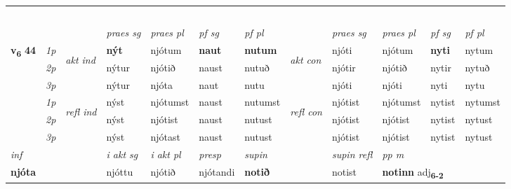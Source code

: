 \begin{longtable}[l]{X>{\footnotesize\itshape}llXXXXlXXXX}
\midrule
  & \\*
   & \\*
     & \\*
   & \\*
  & \\
   \midrule
 & &   & \textit{praes sg}  & \textit{praes pl}    & \textit{ pf sg} & \textit{pf pl} & & \textit{praes sg}  & \textit{praes pl}    & \textit{pf sg} & \textit{pf pl }  \\ \cmidrule{4-7} \cmidrule{9-12}
 \multirow{2}{*}{{{\textbf{v{\textsubscript{6}}} \Large{\textbf{44}}}}}  & 1p & \multirow{3}{*}{\begin{turn}{90}\textit{akt ind}\end{turn}} & \textbf{nýt} & njótum & \textbf{naut} & \textbf{nutum} & \multirow{3}{*}{\begin{turn}{90}\textit{akt con}\end{turn}} &njóti & njótum & \textbf{nyti} & nytum\\*
 & 2p &  &  nýtur  & njótið & naust & nutuð & & njótir & njótið & nytir & nytuð \\*
 & 3p &  & nýtur & njóta & naut & nutu & & njóti & njóti& nyti & nytu \\*
\cmidrule{4-7} \cmidrule{9-12}
 & 1p & \multirow{3}{*}{\begin{turn}{90}\textit{refl ind}\end{turn}}  & nýst & njótumst & naust & nutumst & \multirow{3}{*}{\begin{turn}{90}\textit{refl con}\end{turn}}  &njótist & njótumst & nytist & nytumst \\*
 & 2p &  & nýst & njótist & naust & nutust & &njótist & njótist & nytist & nytust \\*
 & 3p  & & nýst & njótast & naust & nutust & & njótist & njótist& nytist & nytust \\*
\cmidrule{4-7} \cmidrule{9-12}

   {\textit{inf}} & &  & \textit{i akt sg} & \textit{i akt pl}   & \textit{presp} & \textit{supin} && \textit{supin refl} & \textit{pp m} \\*
  {\textbf{njóta}} & && njóttu  & njótið   & njótandi &  \textbf{notið} && notist & \multicolumn{2}{l}{\textbf{notinn} adj\textbf{\textsubscript{6-2}}} \\*

\midrule


\end{longtable}
